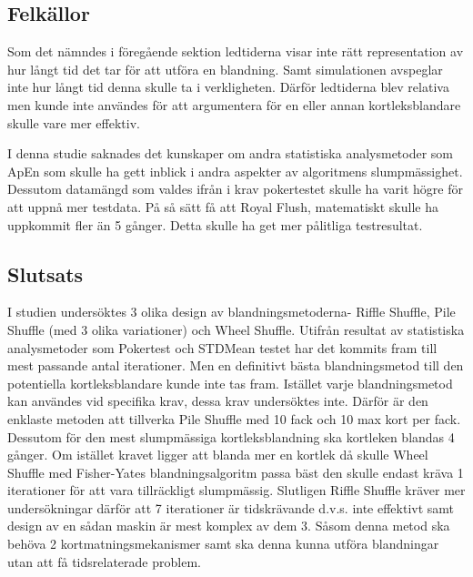\documentclass[swedish,a4paper]{article}
\begin{document}
\subsection{Felkällor}
\label{sec:d_fk}
Som det nämndes i föregående sektion ledtiderna visar inte rätt representation av
hur långt tid det tar för att utföra en blandning. Samt simulationen avspeglar
inte hur långt tid denna skulle ta i verkligheten. Därför ledtiderna blev
relativa men kunde inte användes för att argumentera för en eller annan
kortleksblandare skulle vare mer effektiv.

I denna studie saknades det kunskaper om andra statistiska analysmetoder som
ApEn som skulle ha gett inblick i andra aspekter av algoritmens slumpmässighet.
Dessutom datamängd som valdes ifrån i krav pokertestet skulle ha varit högre
för att uppnå mer testdata. På så sätt få att Royal Flush, matematiskt skulle ha
uppkommit fler än 5 gånger. Detta skulle ha get mer pålitliga testresultat.



\subsection{Slutsats}
\label{sec:d_s}
I studien undersöktes 3 olika design av blandningsmetoderna- Riffle Shuffle, Pile
Shuffle (med 3 olika variationer) och Wheel Shuffle. Utifrån resultat av
statistiska analysmetoder som Pokertest och STDMean testet har det kommits fram
till mest passande antal iterationer. Men en definitivt bästa blandningsmetod
till den potentiella kortleksblandare kunde inte tas fram. Istället varje
blandningsmetod kan användes vid specifika krav, dessa krav undersöktes inte.
Därför är den enklaste metoden att tillverka Pile Shuffle med 10 fack och 10 max
kort per fack. Dessutom för den mest slumpmässiga kortleksblandning ska
kortleken blandas 4 gånger. Om istället kravet ligger att blanda mer en
kortlek då skulle Wheel Shuffle med Fisher-Yates blandningsalgoritm passa bäst
den skulle endast kräva 1 iterationer för att vara tillräckligt slumpmässig.
Slutligen Riffle Shuffle kräver mer undersökningar därför att 7 iterationer är
tidskrävande d.v.s. inte effektivt samt design av en sådan maskin är mest komplex
av dem 3. Såsom denna metod ska behöva 2 kortmatningsmekanismer samt ska denna
kunna utföra blandningar utan att få tidsrelaterade problem.
\end{document}
